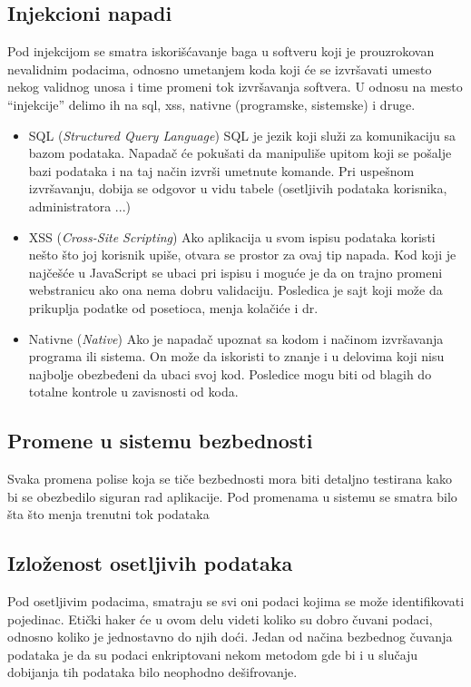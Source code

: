 \documentclass[a4paper]{article}
\begin{document}
{\subsection{Injekcioni napadi}
 Pod injekcijom se smatra iskorišćavanje baga u softveru koji je prouzrokovan nevalidnim podacima, odnosno umetanjem koda koji će se izvršavati umesto nekog validnog unosa i time promeni tok izvršavanja softvera. U odnosu na mesto “injekcije” delimo ih na sql, xss, nativne (programske, sistemske) i druge.
 \begin{itemize}
 \item SQL ({\em Structured Query Language})  SQL je jezik koji služi za komunikaciju sa bazom podataka.
Napadač će pokušati da manipuliše upitom koji se pošalje bazi podataka i na taj način izvrši umetnute komande.
Pri uspešnom izvršavanju, dobija se odgovor u vidu tabele (osetljivih podataka korisnika, administratora ...)
\item XSS ({\em Cross-Site Scripting})  Ako aplikacija u svom ispisu podataka koristi nešto što joj korisnik upiše, otvara se prostor za ovaj tip napada. Kod koji je najčešće u JavaScript se ubaci pri ispisu i moguće je da on trajno promeni webstranicu ako ona nema dobru validaciju. Posledica je sajt koji može da prikuplja podatke od posetioca, menja kolačiće i dr.
\item Nativne ({\em Native}) Ako je napadač upoznat sa kodom i načinom izvršavanja programa ili sistema. On može da iskoristi to znanje i u delovima koji nisu najbolje obezbeđeni da ubaci svoj kod. Posledice mogu biti od blagih do totalne kontrole u zavisnosti od koda.
\end{itemize} \cite{injectionattacks}

\newpage
\subsection{Promene u sistemu bezbednosti}
 Svaka promena polise koja se tiče bezbednosti mora biti detaljno testirana kako bi se obezbedilo siguran rad aplikacije. Pod promenama u sistemu se smatra bilo šta što menja trenutni tok podataka
 
\subsection{Izloženost osetljivih podataka}
Pod osetljivim podacima, smatraju se svi oni podaci kojima se može identifikovati pojedinac. Etički haker će u ovom delu videti koliko su dobro čuvani podaci, odnosno koliko je jednostavno do njih doći. Jedan od načina bezbednog čuvanja podataka je da su podaci enkriptovani nekom metodom gde bi i u slučaju dobijanja tih podataka bilo neophodno dešifrovanje. 

}
\end{document}
